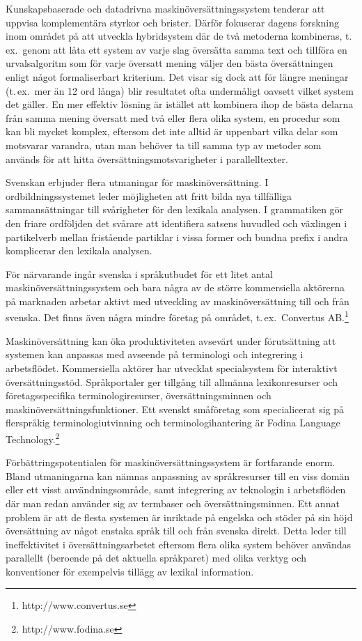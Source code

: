 \begin{multicols}{2}
Kunskapsbaserade och datadrivna maskinöversättningssystem tenderar att
uppvisa komplementära styrkor och brister. Därför fokuserar dagens
forskning inom området på att utveckla hybridsystem där de två
metoderna kombineras, t.\,ex.~genom att låta ett system av varje slag
översätta samma text och tillföra en ur\-vals\-algo\-ritm som för
varje översatt mening väljer den bästa översättningen enligt något
formaliserbart kriterium. Det visar sig dock att för längre meningar
(t.\,ex.~mer än 12 ord långa) blir resultatet ofta undermåligt oavsett
vilket system det gäller. En mer effektiv lösning är istället att
kombinera ihop de bästa delarna från samma mening översatt med två
eller flera olika system, en procedur som kan bli mycket komplex,
eftersom det inte alltid är uppenbart vilka delar som motsvarar
varandra, utan man behöver ta till samma typ av metoder som används
för att hitta översättningsmotsvarigheter i parallelltexter.

Svenskan erbjuder flera utmaningar för maskinöversättning. I
ordbildningssystemet leder möjligheten att fritt bilda nya tillfälliga
sammansättningar till svårigheter för den lexikala analysen. I
grammatiken gör den friare ordföljden det svårare att identifiera
satsens huvudled och växlingen i partikelverb mellan fristående
partiklar i vissa former och bundna prefix i andra komplicerar den
lexikala analysen.

För närvarande ingår svenska i språkutbudet för ett litet antal
maskinöversättningssystem och bara några av de större kommersiella
aktörerna på marknaden arbetar aktivt med utveckling av
maskinöversättning till och från svenska. Det finns även några mindre
företag på området, t.\,ex.~Convertus
AB.\footnote{http://www.convertus.se}


Maskinöversättning kan öka produktiviteten avsevärt under
förutsättning att systemen kan an\-pas\-sas med avseende på
terminologi och integrering i arbetsflödet. Kommersiella aktörer har
utvecklat specialsystem för interaktivt
översättningsstöd. Språkportaler ger tillgång till allmänna
lexikonresurser och företagsspecifika terminologiresurser,
översättningsminnen och maskinöversättningsfunktioner. Ett svenskt
småföretag som specialicerat sig på flerspråkig terminologiutvinning
och terminologihantering är Fodina Language
Technology.\footnote{http://www.fodina.se}

Förbättringspotentialen för maskinöversättnings\-sys\-tem är fortfarande
enorm. Bland utmaningarna kan nämnas anpassning av språkresurser till
en viss domän eller ett visst användningsområde, samt integrering av
teknologin i arbetsflöden där man redan använder sig av termbaser och
översättningsminnen. Ett annat problem är att de flesta systemen är
inriktade på engelska och stöder på sin höjd översättning av något
enstaka språk till och från svenska direkt. Detta leder till
ineffektivitet i översättningsarbetet eftersom flera olika system
behöver användas parallellt (beroende på det aktuella språkparet) med
olika verktyg och konventioner för exempelvis tillägg av lexikal
information.


\end{multicols}

